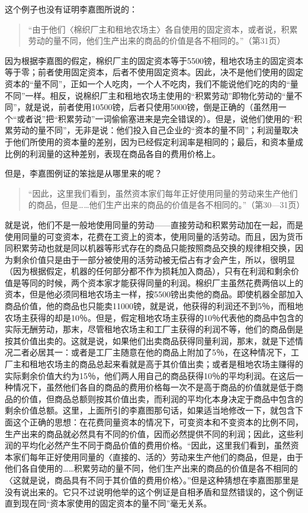 这个例子也没有证明李嘉图所说的：

\begin{quote}{“由于他们〈棉织厂主和租地农场主〉各自使用的固定资本，或者说，积累劳动的量不同，他们生产出来的商品的价值是各不相同的。”（第31页）}\end{quote}

因为根据李嘉图的假定，棉织厂主的固定资本等于5500镑，租地农场主的固定资本等于零；前者使用固定资本，后者不使用固定资本。因此，决不是他们使用的固定资本的“量不同”，正如一个人吃肉，一个人不吃肉，我们不能说他们吃的肉的“量不同”一样。相反，说棉织厂主和租地农场主使用的“积累劳动”即物化劳动的“量不同”，就是说，前者使用10500镑，后者只使用5000镑，倒是正确的（虽然用一个“或者说”把“积累劳动”一词偷偷塞进来是完全错误的）。但是，说他们使用的“积累劳动的量不同”，无非是说：他们投入自己企业的“资本的量不同”；利润量取决于他们所使用的资本量的差别，因为已经假定利润率是相同的；最后，和资本量成比例的利润量的这种差别，表现在商品各自的费用价格上。

但是，李嘉图例证的笨拙是从哪里来的呢？

\begin{quote}{“因此，这里我们看到，虽然资本家们每年正好使用同量的劳动来生产他们的商品，但是……他们生产出来的商品的价值是各不相同的。”（第30—31页）}\end{quote}

就是说，他们不是一般地使用同量的劳动——直接劳动和积累劳动加在一起，而是使用同量的可变资本，花费在工资上的资本，使用同量的活劳动。而且，因为货币同积累劳动也就是同以机器等形式存在的商品只能按照商品交换的规律相交换，因为剩余价值只是由于一部分被使用的活劳动被无偿占有才会产生，所以，很明显（因为根据假定，机器的任何部分都不作为损耗加入商品），只有在利润和剩余价值是等同的时候，两个资本家才能获得同量的利润。棉织厂主虽然花费两倍以上的资本，但是他必须同租地农场主一样，按5500镑出卖他的商品。即使机器全部加入商品价值，他的商品也只能卖11000镑，就是说，他获得的利润还不到5％，而租地农场主获得的却是10％。但是，假定租地农场主获得的10％代表他的商品中包含的实际无酬劳动，那末，尽管租地农场主和工厂主获得的利润不等，他们的商品倒是按其价值出卖的。这就是说，如果他们出卖商品获得同量利润，那末，就是下述情况二者必居其一：或者是工厂主随意在他的商品上附加了5％，在这种情况下，工厂主和租地农场主的商品总起来看就是高于其价值出卖；或者是租地农场主赚得的实际剩余价值大约为15％，他们两人用自己的商品获得10％的平均利润。在这后一种情况下，虽然他们各自的商品的费用价格每一次不是高于商品的价值就是低于商品的价值，但商品总额则按其价值出卖，而利润的平均化本身决定于商品中包含的剩余价值总额。这里，上面所引的李嘉图那句话，如果适当地修改一下，就包含下面这个正确的思想：在花费同量资本的情况下，可变资本和不变资本的比例不同，生产出来的商品就必然具有不同的价值，因而必然提供不同的利润；因此，这些利润的平均化必然产生不同于商品价值的费用价格。“因此，这里我们看到，虽然资本家们每年正好使用同量的〈直接的、活的〉劳动来生产他们的商品，但是，由于他们各自使用的……积累劳动的量不同，他们生产出来的商品的价值是各不相同的〈这就是说，商品具有不同于其价值的费用价格〉。”但是这种猜想在李嘉图那里是没有说出来的。它只不过说明他举的这个例证是自相矛盾和显然错误的，这个例证直到现在同“资本家使用的固定资本的量不同”毫无关系。

